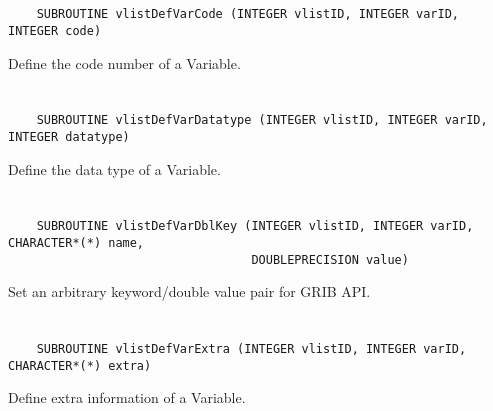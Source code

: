 \section*{\tt {}}

\begin{verbatim}
    SUBROUTINE vlistDefVarCode (INTEGER vlistID, INTEGER varID, INTEGER code)
\end{verbatim}

Define the code number of a Variable.


\section*{\tt {}}

\begin{verbatim}
    SUBROUTINE vlistDefVarDatatype (INTEGER vlistID, INTEGER varID, INTEGER datatype)
\end{verbatim}

Define the data type of a Variable.


\section*{\tt {}}

\begin{verbatim}
    SUBROUTINE vlistDefVarDblKey (INTEGER vlistID, INTEGER varID, CHARACTER*(*) name,
                                  DOUBLEPRECISION value)
\end{verbatim}

Set an arbitrary keyword/double value pair for GRIB API.


\section*{\tt {}}

\begin{verbatim}
    SUBROUTINE vlistDefVarExtra (INTEGER vlistID, INTEGER varID, CHARACTER*(*) extra)
\end{verbatim}

Define extra information of a Variable.


\section*{\tt {}}

